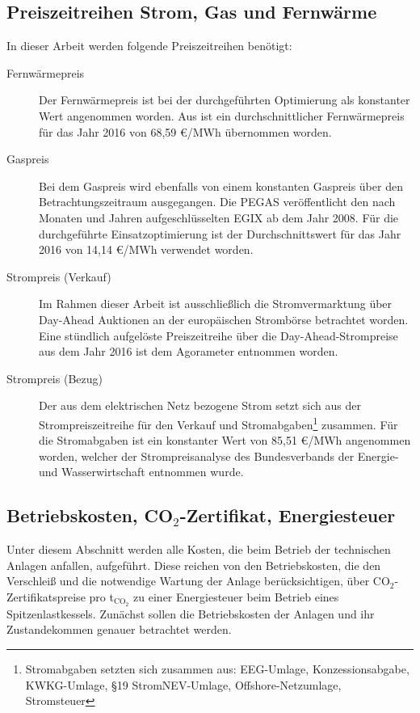 \subsection*{Preiszeitreihen Strom, Gas und Fernwärme}
In dieser Arbeit werden folgende Preiszeitreihen benötigt:
	\begin{description}
		\item[Fernwärmepreis] Der Fernwärmepreis ist bei der durchgeführten Optimierung als konstanter Wert angenommen worden. Aus \citet{Kaldemeyer2019} ist ein durchschnittlicher Fernwärmepreis für das Jahr 2016 von 68,59 \euro/MWh übernommen worden.
		\item[Gaspreis] Bei dem Gaspreis wird ebenfalls von einem konstanten Gaspreis über den Betrachtungszeitraum ausgegangen. Die \ac{PEGAS} veröffentlicht den nach Monaten und Jahren aufgeschlüsselten \ac{EGIX} ab dem Jahr 2008. Für die durchgeführte Einsatzoptimierung ist der Durchschnittswert für das Jahr 2016 von 14,14 \euro/MWh verwendet worden. \cite{GasPrice}
		\item[Strompreis (Verkauf)] Im Rahmen dieser Arbeit ist ausschließlich die Stromvermarktung über Day-Ahead Auktionen an der europäischen Strombörse betrachtet worden. Eine stündlich aufgelöste Preiszeitreihe über die Day-Ahead-Strompreise aus dem Jahr 2016 ist dem Agorameter \cite{Agora2016} entnommen worden.
		\item[Strompreis (Bezug)] Der aus dem elektrischen Netz bezogene Strom setzt sich aus der Strompreiszeitreihe für den Verkauf und Stromabgaben\footnote{Stromabgaben setzten sich zusammen aus: EEG-Umlage, Konzessionsabgabe, KWKG-Umlage, §19 StromNEV-Umlage, Offshore-Netzumlage, Stromsteuer} zusammen. Für die Stromabgaben ist ein konstanter Wert von 85,51 \euro/MWh angenommen worden, welcher der Strompreisanalyse des Bundesverbands der Energie- und Wasserwirtschaft \cite{BDEW} entnommen wurde. 
	\end{description} 

\subsection*{Betriebskosten, CO$_2$-Zertifikat, Energiesteuer}
Unter diesem Abschnitt werden alle Kosten, die beim Betrieb der technischen Anlagen anfallen, aufgeführt. Diese reichen von den Betriebskosten, die den Verschleiß und die notwendige Wartung der Anlage berücksichtigen, über CO$_2$-Zertifikatspreise pro t$_{\text{CO}_2}$ zu einer Energiesteuer beim Betrieb eines Spitzenlastkessels. Zunächst sollen die Betriebskosten der Anlagen und ihr Zustandekommen genauer betrachtet werden.
